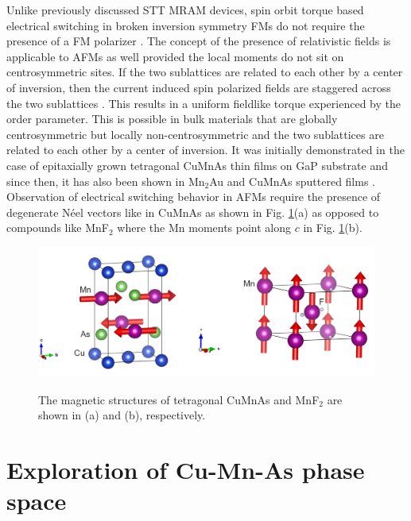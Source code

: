\documentclass[letterpaper,10pt,doublespacing,edeposit]{uiucthesis2020}
\begin{document}
\begin{mainmatter}
Unlike previously discussed STT MRAM devices, spin orbit torque based electrical switching in broken inversion symmetry FMs do not require the presence of a FM polarizer \cite{Manchon2008}. The concept of the presence of relativistic fields is applicable to AFMs as well provided the local moments do not sit on centrosymmetric sites. If the two sublattices are related to each other by a center of inversion, then the current induced spin polarized fields are staggered across the two sublattices \cite{Zelezny2014,Zelezny2017,Wadley2016}. This results in a uniform fieldlike torque experienced by the order parameter. This is possible in bulk materials that are globally centrosymmetric but locally non-centrosymmetric and the two sublattices are related to each other by a center of inversion. It was initially demonstrated in the case of epitaxially grown tetragonal CuMnAs thin films on GaP substrate \cite{Wadley2016} and since then, it has also been shown in Mn$_2$Au and CuMnAs sputtered films \cite{Meinert2018,Matalla-Wagner2019}. Observation of electrical switching behavior in AFMs require the presence of degenerate N\'eel vectors like in CuMnAs as shown in Fig. \ref{fig:tet-CuMnAs}(a) as opposed to compounds like MnF$_2$ where the Mn moments point along $c$ in Fig. \ref{fig:tet-CuMnAs}(b).


\begin{figure}
\centering\includegraphics[width=\columnwidth]{figures/ch1/CuMnAs-MnF2.png} \\
\caption{\label{fig:tet-CuMnAs}
The magnetic structures of tetragonal CuMnAs and MnF$_2$ are shown in (a) and (b), respectively.
}
\end{figure}

\section{Exploration of Cu-Mn-As phase space}


\end{mainmatter}
\end{document}
